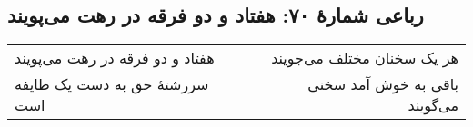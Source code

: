 \begin{center}
\section*{رباعی شمارهٔ ۷۰: هفتاد و دو فرقه در رهت می‌پویند}
\label{sec:070}
\begin{longtable}{l p{0.5cm} r}
هفتاد و دو فرقه در رهت می‌پویند
&&
هر یک سخنان مختلف می‌جویند
\\
سررشتهٔ حق به دست یک طایفه است
&&
باقی به خوش آمد سخنی می‌گویند
\\
\end{longtable}
\end{center}
